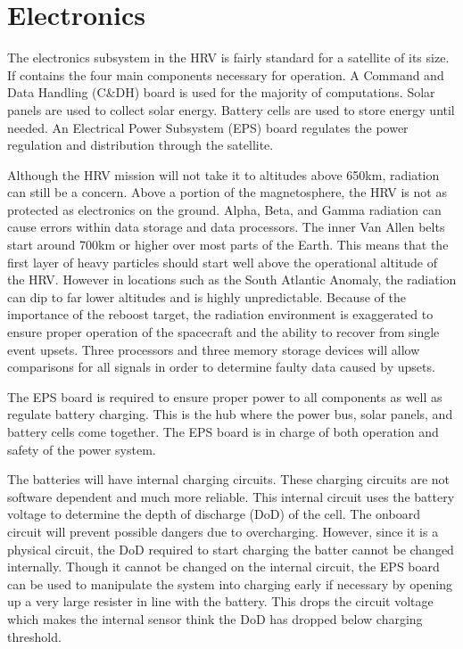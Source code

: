 \documentclass[onecolumn,10pt]{jhwhw}
\begin{document}
\chapter{Electronics}

The electronics subsystem in the HRV is fairly standard for a satellite of its size. If contains the four main components necessary for operation. A Command and Data Handling (C\&DH) board is used for the majority of computations. Solar panels are used to collect solar energy. Battery cells are used to store energy until needed. An Electrical Power Subsystem (EPS) board regulates the power regulation and distribution through the satellite.

Although the HRV mission will not take it to altitudes above 650km, radiation can still be a concern. Above a portion of the magnetosphere, the HRV is not as protected as electronics on the ground. Alpha, Beta, and Gamma radiation can cause errors within data storage and data processors. The inner Van Allen belts start around 700km or higher over most parts of the Earth. This means that the first layer of heavy particles should start well above the operational altitude of the HRV. However in locations such as the South Atlantic Anomaly, the radiation can dip to far lower altitudes and is highly unpredictable. Because of the importance of the reboost target, the radiation environment is exaggerated to ensure proper operation of the spacecraft and the ability to recover from single event upsets. Three processors and three memory storage devices will allow comparisons for all signals in order to determine faulty data caused by upsets.

The EPS board is required to ensure proper power to all components as well as regulate battery charging. This is the hub where the power bus, solar panels, and battery cells come together. The EPS board is in charge of both operation and safety of the power system.

The batteries will have internal charging circuits. These charging circuits are not software dependent and much more reliable. This internal circuit uses the battery voltage to determine the depth of discharge (DoD) of the cell. The onboard circuit will prevent possible dangers due to overcharging. However, since it is a physical circuit, the DoD required to start charging the batter cannot be changed internally. Though it cannot be changed on the internal circuit, the EPS board can be used to manipulate the system into charging early if necessary by opening up a very large resister in line with the battery. This drops the circuit voltage which makes the internal sensor think the DoD has dropped below charging threshold.
\end{document}
